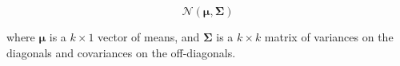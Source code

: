 \begin{equation}
    \mathcal{N}
    \left(
      \boldsymbol{\mu},
      \boldsymbol{\Sigma}
    \right)
    \label{eq:mvn}
\end{equation}

\noindent where
$\boldsymbol{\mu}$ is a $k \times 1$
vector of means,
and
$\boldsymbol{\Sigma}$ is a $k \times k$
matrix of variances on the diagonals
and covariances on the off-diagonals.
